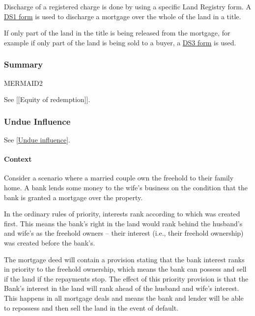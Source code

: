 \documentclass[
]{article}
\begin{document}
Discharge of a registered charge is done by using a specific Land
Registry form. A
\href{https://assets.publishing.service.gov.uk/government/uploads/system/uploads/attachment_data/file/808695/DS1__2019-06-17_.pdf}{DS1
form} is used to discharge a mortgage over the whole of the land in a
title.

If only part of the land in the title is being released from the
mortgage, for example if only part of the land is being sold to a buyer,
a
\href{https://assets.publishing.service.gov.uk/government/uploads/system/uploads/attachment_data/file/713043/DS3__2018-05-25_.pdf}{DS3
form} is used.

\hypertarget{summary}{%
\subsubsection{Summary}\label{summary}}

MERMAID2

See {[}{[}Equity of redemption{]}{]}.

\hypertarget{undue-influence}{%
\subsubsection{Undue Influence}\label{undue-influence}}

See {[}\protect\hyperlink{undue-influence}{Undue influence}{]}.

\hypertarget{context-2}{%
\paragraph{Context}\label{context-2}}

Consider a scenario where a married couple own the freehold to their
family home. A bank lends some money to the wife's business on the
condition that the bank is granted a mortgage over the property.

In the ordinary rules of priority, interests rank according to which was
created first. This means the bank's right in the land would rank behind
the husband's and wife's as the freehold owners -- their interest (i.e.,
their freehold ownership) was created before the bank's.

The mortgage deed will contain a provision stating that the bank
interest ranks in priority to the freehold ownership, which means the
bank can possess and sell if the land if the repayments stop. The effect
of this priority provision is that the Bank's interest in the land will
rank ahead of the husband and wife's interest. This happens in all
mortgage deals and means the bank and lender will be able to repossess
and then sell the land in the event of default.
\end{document}
